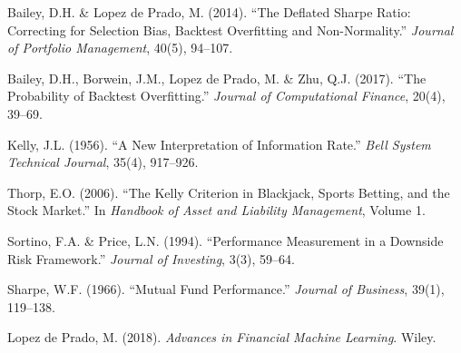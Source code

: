 \documentclass[12pt,a4paper]{report}
\theoremstyle{definition}
\begin{document}
\begin{enumerate}[label={[\arabic*]}]
    \item Bailey, D.H. \& Lopez de Prado, M. (2014). ``The Deflated Sharpe Ratio: Correcting for Selection Bias, Backtest Overfitting and Non-Normality.'' \textit{Journal of Portfolio Management}, 40(5), 94--107.

    \item Bailey, D.H., Borwein, J.M., Lopez de Prado, M. \& Zhu, Q.J. (2017). ``The Probability of Backtest Overfitting.'' \textit{Journal of Computational Finance}, 20(4), 39--69.

    \item Kelly, J.L. (1956). ``A New Interpretation of Information Rate.'' \textit{Bell System Technical Journal}, 35(4), 917--926.

    \item Thorp, E.O. (2006). ``The Kelly Criterion in Blackjack, Sports Betting, and the Stock Market.'' In \textit{Handbook of Asset and Liability Management}, Volume 1.

    \item Sortino, F.A. \& Price, L.N. (1994). ``Performance Measurement in a Downside Risk Framework.'' \textit{Journal of Investing}, 3(3), 59--64.

    \item Sharpe, W.F. (1966). ``Mutual Fund Performance.'' \textit{Journal of Business}, 39(1), 119--138.

    \item Lopez de Prado, M. (2018). \textit{Advances in Financial Machine Learning}. Wiley.
\end{enumerate}


\end{document}
